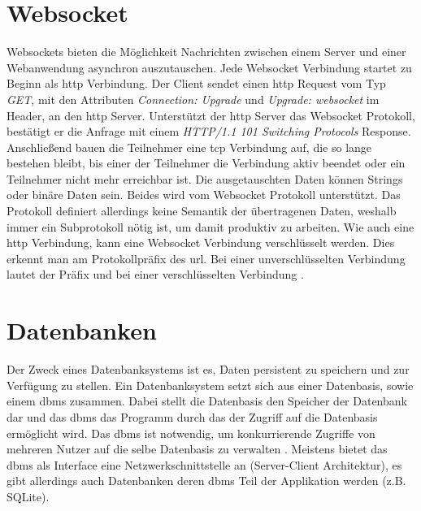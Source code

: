 \section{Websocket}
Websockets bieten die Möglichkeit Nachrichten zwischen einem Server und einer Webanwendung asynchron auszutauschen.
Jede Websocket Verbindung startet zu Beginn als \ac{http} Verbindung. 
Der Client sendet einen \ac{http} Request vom Typ \emph{GET},
mit den Attributen \emph{Connection: Upgrade} und \emph{Upgrade: websocket} im Header, an den \ac{http} Server.
Unterstützt der \ac{http} Server das Websocket Protokoll, 
bestätigt er die Anfrage mit einem \emph{HTTP/1.1 101 Switching Protocols} Response.
Anschließend bauen die Teilnehmer eine \ac{tcp} Verbindung auf, die so lange bestehen bleibt, bis einer der Teilnehmer die Verbindung aktiv beendet 
oder ein Teilnehmer nicht mehr erreichbar ist.
Die ausgetauschten Daten können Strings oder binäre Daten sein. Beides wird vom Websocket Protokoll unterstützt.
Das Protokoll definiert allerdings keine Semantik der übertragenen Daten, 
weshalb immer ein Subprotokoll nötig ist, um damit produktiv zu arbeiten.
Wie auch eine \ac{http} Verbindung, kann eine Websocket Verbindung verschlüsselt werden. Dies erkennt man am Protokollpräfix des \ac{url}.
Bei einer unverschlüsselten Verbindung lautet der Präfix  und bei einer verschlüsselten Verbindung .

\section{Datenbanken}
Der Zweck eines Datenbanksystems ist es, Daten persistent zu speichern und zur Verfügung zu stellen.
Ein Datenbanksystem setzt sich aus einer Datenbasis, sowie einem \ac{dbms} zusammen.
Dabei stellt die Datenbasis den Speicher der Datenbank dar und das \ac{dbms} 
das Programm durch das der Zugriff auf die Datenbasis ermöglicht wird.
Das \ac{dbms} ist notwendig, um konkurrierende Zugriffe von mehreren Nutzer auf die selbe Datenbasis zu verwalten \citep{Schubert:2007:3}. 
Meistens bietet das \ac{dbms} als Interface eine Netzwerkschnittstelle an (Server-Client Architektur), es gibt allerdings auch Datenbanken deren \ac{dbms} Teil der Applikation werden (z.B. SQLite).


